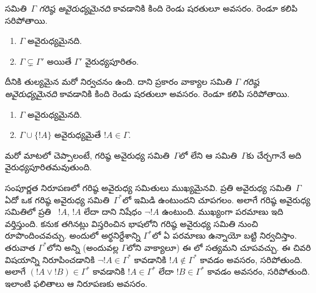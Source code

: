 \documentclass[../../../include/open-logic-section]{subfiles}
\begin{document}

\begin{defn}[గరిష్ఠ అవైరుధ్య సమితి]
 సమితి~$\Gamma$ \emph{గరిష్ఠ అవైరుధ్యమైనది} కావడానికి కింది రెండు షరతులూ అవసరం. రెండూ కలిపి సరిపోతాయి.
\begin{enumerate}
\item $\Gamma$ అవైరుధ్యమైనది.
\item $\Gamma \subsetneq \Gamma'$ అయితే $\Gamma'$ వైరుధ్యపూరితం.
\end{enumerate}
\end{defn}

\begin{explain}
దీనికి తుల్యమైన మరో నిర్వచనం ఉంది. దాని ప్రకారం వాక్యాల సమితి $\Gamma$ \emph{గరిష్ఠ అవైరుధ్యమైనది} కావడానికి కింది రెండు షరతులూ అవసరం. రెండూ కలిపి సరిపోతాయి.
\begin{enumerate}
\item $\Gamma$ అవైరుధ్యమైనది.
\item $\Gamma \cup \{ !A \}$ అవైరుధ్యమైతే $!A \in \Gamma$.
\end{enumerate}
మరో మాటలో చెప్పాలంటే, గరిష్ఠ అవైరుధ్య సమితి~$\Gamma$లో లేని  ఆ సమితి~$\Gamma$కు చేర్చగానే అది వైరుధ్యపూరితమవుతుంది.
\end{explain}

\begin{explain}
సంపూర్ణత నిరూపణలో గరిష్ఠ అవైరుధ్య సమితులు ముఖ్యమైనవి. ప్రతి అవైరుధ్య  సమితి~$\Gamma$ ఏదో ఒక గరిష్ఠ అవైరుధ్య సమితి~$\Gamma^*$లో ఇమిడి ఉంటుందని చూపగలం. అలాగే గరిష్ఠ అవైరుధ్య సమితిలో ప్రతి ~$!A$, $!A$ లేదా దాని నిషేధం $\lnot !A$ ఉంటుంది. ముఖ్యంగా పరమాణు  ఇది వర్తిస్తుంది. కనుక  తగినట్లు విస్తరించిన భాషలోని గరిష్ఠ అవైరుధ్య సమితి నుంచి  రూపొందించవచ్చు. అందులో  అర్థనిర్దేశాన్ని $\Gamma^*$లో ఏ పరమాణు  ఉన్నాయో బట్టి నిర్వచిస్తాం. తరువాత $\Gamma^*$లోని అన్ని  (అందువల్ల $\Gamma$లోని వాక్యాలూ) ఈ లో సత్యమని చూపవచ్చు. ఈ చివరి విషయాన్ని నిరూపించడానికి $\lnot !A \in
\Gamma^*$ కావడానికి $!A \notin \Gamma^*$ కావడం అవసరం, సరిపోతుంది. అలాగే $(!A \lor !B) \in \Gamma^*$ కావడానికి $!A
\in \Gamma^*$ లేదా $!B \in \Gamma^*$ కావడం అవసరం, సరిపోతుంది. ఇలాంటి ఫలితాలు ఆ నిరూపణకు అవసరం.
\end{explain}
\end{document}
